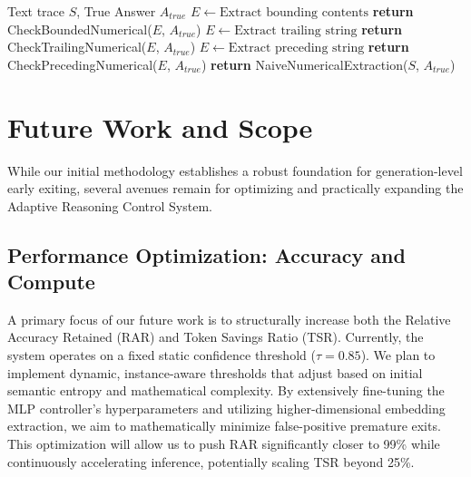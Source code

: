\documentclass[11pt]{article}
\begin{document}
\begin{algorithm}[H]
\caption{Cascaded Extraction Protocol ($f_{verify}$)}
\label{alg:extraction}
\begin{algorithmic}[1]
\REQUIRE Text trace $S$, True Answer $A_{true}$
    \STATE $E \leftarrow \text{Extract bounding contents}$
    \STATE \textbf{return} CheckBoundedNumerical($E$, $A_{true}$)
\ENDIF
{}
    \STATE $E \leftarrow \text{Extract trailing string}$
    \STATE \textbf{return} CheckTrailingNumerical($E$, $A_{true}$)
\ENDIF
{}
    \STATE $E \leftarrow \text{Extract preceding string}$
    \STATE \textbf{return} CheckPrecedingNumerical($E$, $A_{true}$)
\ENDIF
\STATE \textbf{return} NaiveNumericalExtraction($S$, $A_{true}$)
\end{algorithmic}
\end{algorithm}

\section{Future Work and Scope}
While our initial methodology establishes a robust foundation for generation-level early exiting, several avenues remain for optimizing and practically expanding the Adaptive Reasoning Control System. 

\subsection{Performance Optimization: Accuracy and Compute}
A primary focus of our future work is to structurally increase both the Relative Accuracy Retained (RAR) and Token Savings Ratio (TSR). Currently, the system operates on a fixed static confidence threshold ($\tau = 0.85$). We plan to implement dynamic, instance-aware thresholds that adjust based on initial semantic entropy and mathematical complexity. By extensively fine-tuning the MLP controller's hyperparameters and utilizing higher-dimensional embedding extraction, we aim to mathematically minimize false-positive premature exits. This optimization will allow us to push RAR significantly closer to 99\% while continuously accelerating inference, potentially scaling TSR beyond 25\%. 
\end{document}
